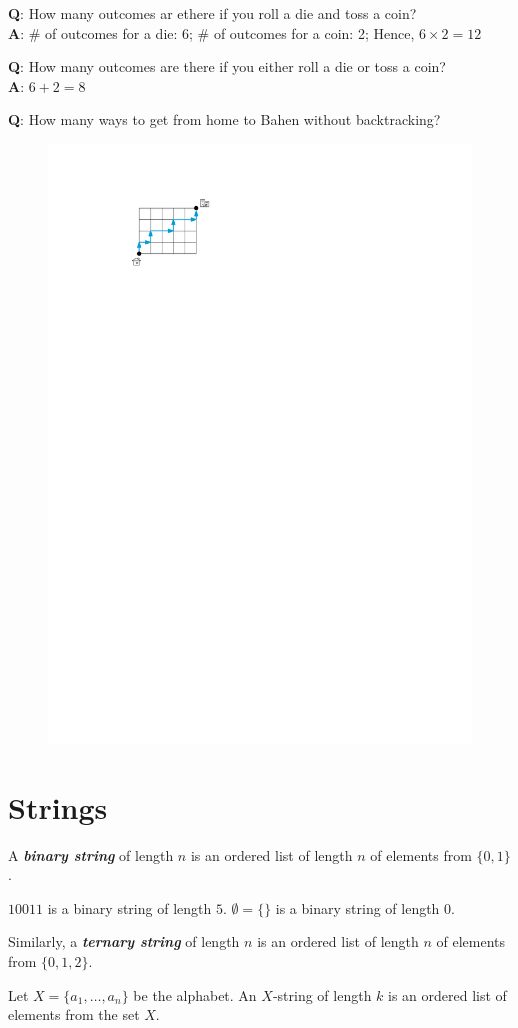 



\textbf{Q}: How many outcomes ar ethere if you roll a die and toss a coin? \\
\textbf{A}: \# of outcomes for a die: 6; \# of outcomes for a coin: 2; Hence, $6 \times 2 = 12$

\textbf{Q}: How many outcomes are there if you either roll a die or toss a coin? \\
\textbf{A}: $6 + 2 = 8$ 

\textbf{Q}: How many ways to get from home to Bahen without backtracking?
\begin{figure}[htbp]
   \centering
   \includegraphics[width=0.3\linewidth]{figures/house-to-bahen-path.pdf}
   \label{fig:home-to-bahen}
\end{figure}

\section{Strings}

\begin{definition}
   A \textit{\textbf{binary string}} of length $n$ is an ordered list of length $n$ of elements from $\{0,1\}$. 
\end{definition}

\begin{example}
   $10011$ is a binary string of length $5$. $\emptyset = \{\}$ is a binary string of length $0$.
\end{example}

Similarly, a \textit{\textbf{ternary string}} of length $n$ is an ordered list of length $n$ of elements from $\{0,1,2\}$.

\begin{definition}[X-String]
   Let $X = \{a_1,\ldots,a_n\}$ be the alphabet. An $X$-string of length $k$ is an ordered list of elements from the set $X$.
\end{definition}

